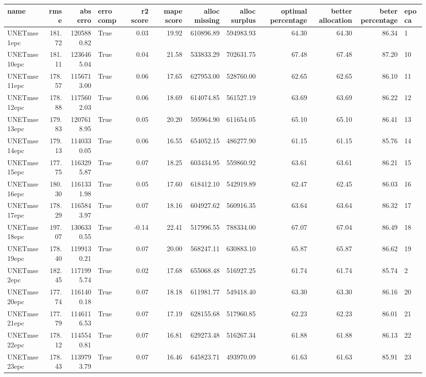 \begin{tabular}{lrrlrrrrrrrl}
\toprule
name & rmse & abs erro & erro comp & r2 score & mape score & alloc missing & alloc surplus & optimal percentage & better allocation & beter percentage & epoca \\
\midrule
UNETmse1epc & 181.72 & 1205880.82 & True & 0.03 & 19.92 & 610896.89 & 594983.93 & 64.30 & 64.30 & 86.34 & 1 \\
UNETmse10epc & 181.11 & 1236465.04 & True & 0.04 & 21.58 & 533833.29 & 702631.75 & 67.48 & 67.48 & 87.20 & 10 \\
UNETmse11epc & 178.57 & 1156713.00 & True & 0.06 & 17.65 & 627953.00 & 528760.00 & 62.65 & 62.65 & 86.10 & 11 \\
UNETmse12epc & 178.88 & 1175602.03 & True & 0.06 & 18.69 & 614074.85 & 561527.19 & 63.69 & 63.69 & 86.22 & 12 \\
UNETmse13epc & 179.83 & 1207618.95 & True & 0.05 & 20.20 & 595964.90 & 611654.05 & 65.10 & 65.10 & 86.41 & 13 \\
UNETmse14epc & 179.13 & 1140330.05 & True & 0.06 & 16.55 & 654052.15 & 486277.90 & 61.15 & 61.15 & 85.76 & 14 \\
UNETmse15epc & 177.75 & 1163295.87 & True & 0.07 & 18.25 & 603434.95 & 559860.92 & 63.61 & 63.61 & 86.21 & 15 \\
UNETmse16epc & 180.30 & 1161331.98 & True & 0.05 & 17.60 & 618412.10 & 542919.89 & 62.47 & 62.45 & 86.03 & 16 \\
UNETmse17epc & 178.29 & 1165843.97 & True & 0.07 & 18.16 & 604927.62 & 560916.35 & 63.64 & 63.64 & 86.32 & 17 \\
UNETmse18epc & 197.07 & 1306330.55 & True & -0.14 & 22.41 & 517996.55 & 788334.00 & 67.07 & 67.04 & 86.49 & 18 \\
UNETmse19epc & 178.40 & 1199130.21 & True & 0.07 & 20.00 & 568247.11 & 630883.10 & 65.87 & 65.87 & 86.62 & 19 \\
UNETmse2epc & 182.45 & 1171995.74 & True & 0.02 & 17.68 & 655068.48 & 516927.25 & 61.74 & 61.74 & 85.74 & 2 \\
UNETmse20epc & 177.74 & 1161400.18 & True & 0.07 & 18.18 & 611981.77 & 549418.40 & 63.30 & 63.30 & 86.16 & 20 \\
UNETmse21epc & 177.79 & 1146116.53 & True & 0.07 & 17.19 & 628155.68 & 517960.85 & 62.23 & 62.23 & 86.01 & 21 \\
UNETmse22epc & 178.12 & 1145540.81 & True & 0.07 & 16.81 & 629273.48 & 516267.34 & 61.88 & 61.88 & 86.13 & 22 \\
UNETmse23epc & 178.43 & 1139793.79 & True & 0.07 & 16.46 & 645823.71 & 493970.09 & 61.63 & 61.63 & 85.91 & 23 \\

\end{tabular}
